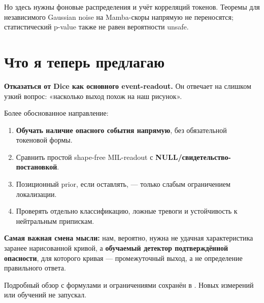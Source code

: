 \documentclass[a4paper,11pt]{article}
\begin{document}
Но здесь нужны фоновые распределения и учёт корреляций токенов. Теоремы для
независимого Gaussian noise на Mamba-скоры напрямую не переносятся;
статистический p-value также не равен вероятности unsafe.

\section*{Что я теперь предлагаю}

\textbf{Отказаться от Dice как основного event-readout.} Он отвечает на слишком
узкий вопрос: «насколько выход похож на наш рисунок».

Более обоснованное направление:
\begin{enumerate}
  \item \textbf{Обучать наличие опасного события напрямую}, без обязательной
    токеновой формы.
  \item Сравнить простой shape-free MIL-readout с \textbf{NULL/свидетельство-постановкой}.
  \item Позиционный prior, если оставлять, --- только слабым ограничением локализации.
  \item Проверять отдельно классификацию, ложные тревоги и устойчивость к
    нейтральным припискам.
\end{enumerate}

\textbf{Самая важная смена мысли:} нам, вероятно, нужна не удачная характеристика
заранее нарисованной кривой, а \textbf{обучаемый детектор подтверждённой опасности},
для которого кривая --- промежуточный выход, а не определение правильного ответа.

Подробный обзор с формулами и ограничениями сохранён в
\textenglish{}. Новых измерений или обучений не запускал.
\end{document}
